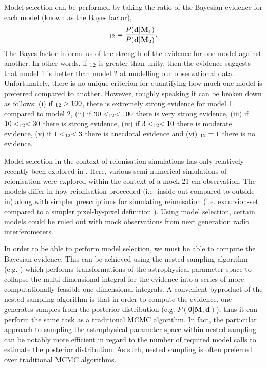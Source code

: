 Model selection can be performed by taking the ratio of the Bayesian evidence for each model (known as the Bayes factor),
\begin{eqnarray} \label{eq:BayesMS}
\altmathcal{B}_{12} = \frac{P(\mathbf{d}|\mathbf{M}_{1})}{P(\mathbf{d}|\mathbf{M}_{2})}.
\end{eqnarray}
The Bayes factor informs us of the strength of the evidence for one model against another. In other words, if $\altmathcal{B}_{12}$ is greater than unity, then the evidence suggests that model 1 is better than model 2 at modelling our observational data. Unfortunately, there is no unique criterion for quantifying how much one model is preferred compared to another. However, roughly speaking it can be broken down as follows: (i) if $\altmathcal{B}_{12} > 100$, there is extremely strong evidence for model 1 compared to model 2, (ii) if $30 < \altmathcal{B}_{12} < 100$ there is very strong evidence, (iii) if $10 < \altmathcal{B}_{12} < 30$ there is strong evidence, (iv) if $3 < \altmathcal{B}_{12} < 10$ there is moderate evidence, (v) if $1 < \altmathcal{B}_{12} < 3$ there is anecdotal evidence and (vi) $\altmathcal{B}_{12} = 1$ there is no evidence.

Model selection in the context of reionisation simulations has only relatively recently been explored in \cite{Binnie:2019}. Here, various semi-numerical simulations of reionisation were explored within the context of a mock 21-cm observation. The models differ in how reionisation proceeded (i.e. inside-out compared to outside-in) along with simpler prescriptions for simulating reionisation (i.e. excursion-set compared to a simpler pixel-by-pixel definition \cite{MiraldaEscude:2000}). Using model selection, certain models could be ruled out with mock observations from next generation radio interferometers.

In order to be able to perform model selection, we must be able to compute the Bayesian evidence. This can be achieved using the nested sampling algorithm (e.g. \cite{Skilling:2004}) which performs transformations of the astrophysical parameter space to collapse the multi-dimensional integral for the evidence into a series of more computationally feasible one-dimensional integrals. A convenient byproduct of the nested sampling algorithm is that in order to compute the evidence, one generates samples from the posterior distribution (e.g. $P(\mathbf{\theta}|\mathbf{M},\mathbf{d})$), thus it can perform the same task as a traditional MCMC algorithm. In fact, the particular approach to sampling the astrophysical parameter space within nested sampling can be notably more efficient in regard to the number of required model calls to estimate the posterior distribution. As such, nested sampling is often preferred over traditional MCMC algorithms.

